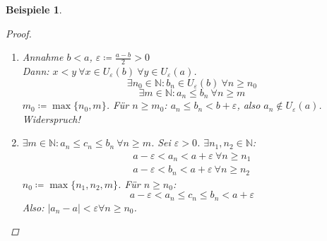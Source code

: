 \documentclass[14pt,titlepage,ngerman,a4paper,headsepline,DIV15,halfparskip*]{scrartcl}
\newcommand{\N}{\mathbb{N}}
\theoremstyle{named}
\theoremstyle{dotless}
\newtheorem*{beispiele}{Beispiele}
\begin{document}
\begin{beispiele}
\begin{proof}
\begin{enumerate}
\begin{enumerate}
					$$
						c_{n} \leq c(|b_{n}-b| + |a_{n}-a|) \eqqcolon \alpha_{n} \xRightarrow[c) (ii), c) (iii)]{a)} \alpha_{n} \rightarrow 0
					$$
					Also: $|c_{n} - 0| = c_{n} \leq \alpha_{n} ~\forall n \in \N$ und $\alpha_{n} \rightarrow 0 \xRightarrow[]{b)} c_{n} \rightarrow 0$.
				\item $\varepsilon \coloneqq \frac{|a|}{2}$; aus (i): $|a_{n}| \rightarrow |a| \Rightarrow \exists n \in N$:
					$$
						 |a_{n}| \in U_{\varepsilon}(|a|) = (|a| - \varepsilon, |a| + \varepsilon) = (\frac{|a|}{2}, \frac{3}{2} |a|) \quad \forall n \geq m
					$$
					$\Rightarrow |a_{n}| > \frac{|a|}{2} > 0 ~\forall n \geq m \Rightarrow a_{n} \neq 0 ~\forall n \geq m$. \\
					Für $n \geq m$:
					$$
						\left| \frac{1}{a_{n}} - \frac{1}{a} \right| = \frac{|a_{n} - a|}{|a_{n}||a|} \leq \frac{2|a_{n} - a|}{|a|^{2}} \eqqcolon \alpha_{n}
					$$
					$\alpha_{n} \rightarrow 0 \xRightarrow[]{b)} \frac{1}{a_{n}} \rightarrow \frac{1}{a}$.
			  \end{enumerate}
			\item Annahme $b < a$, $\varepsilon \coloneqq \frac{a-b}{2} > 0$ ~  \\
				Dann: $x < y ~\forall x \in U_{\varepsilon}(b) ~\forall y \in U_{\varepsilon}(a)$. \\
				$$ \exists n_{0} \in \N: b_{n} \in U_{\varepsilon}(b) ~\forall n \geq n_{0} $$
				$$ \exists m \in \N: a_{n} \leq b_{n} ~\forall n \geq m $$
				$m_{0} \coloneqq \max \{ n_{0}, m \}$. Für $n \geq m_{0}$: $a_{n} \leq b_{n} < b + \varepsilon$, also $a_{n} \notin U_{\varepsilon}(a)$. Widerspruch!   
			\item $\exists m \in \N: a_{n} \leq c_{n} \leq b_{n} ~\forall n \geq m$. Sei $\varepsilon > 0$. $\exists n_{1}, n_{2} \in \N$: 
				\begin{align*}
					a - \varepsilon < a_{n} < a + \varepsilon ~\forall n \geq n_{1} \\
					a - \varepsilon < b_{n} < a + \varepsilon ~\forall n \geq n_{2}
				\end{align*}
				$n_{0} \coloneqq \max \{ n_{1}, n_{2}, m \}$. Für $n \geq n_{0}$:
				$$
					a - \varepsilon < a_{n} \leq c_{n} \leq b_{n} < a + \varepsilon
				$$
				Also: $|a_{n} - a| < \varepsilon \forall n \geq n_{0}$.
		\end{enumerate}	
	\end{proof}	
\end{beispiele}
\end{document}
